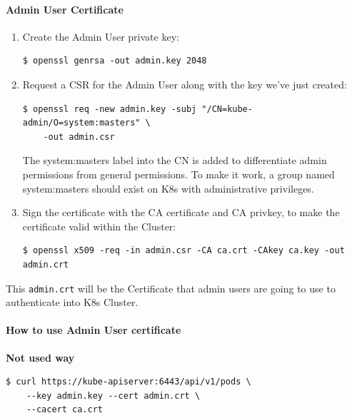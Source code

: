\documentclass{article}
\newenvironment{blocktemplateI}[1]{%
    \tcolorbox[beamer,%
    noparskip,breakable,
    colframe=Violet,%
    colbacklower=Black,%
    title=#1]}%
    {\endtcolorbox}
\newenvironment{codetemplate}[1][]{%
  \mybasecolorbox[#1]
  \itshape
}{%
  \endmybasecolorbox
}
\begin{document}
\paragraph{Admin User Certificate}

\begin{enumerate}
    \item Create the Admin User private key:
\begin{codetemplate}{}
\begin{verbatim}
$ openssl genrsa -out admin.key 2048
\end{verbatim}
\end{codetemplate}

    \item Request a CSR for the Admin User along with the key we've just created:
\begin{codetemplate}{}
\begin{verbatim}
$ openssl req -new admin.key -subj "/CN=kube-admin/O=system:masters" \
    -out admin.csr
\end{verbatim}
\end{codetemplate}
\begin{blocktemplateI}{Note}
The system:masters label into the CN is added to differentiate admin permissions from general permissions. To make it work, a group named system:masters should exist on K8s with administrative privileges.
\end{blocktemplateI}

    \item Sign the certificate with the CA certificate and CA privkey, to make the certificate valid within the Cluster:
\begin{codetemplate}{}
\begin{verbatim}
$ openssl x509 -req -in admin.csr -CA ca.crt -CAkey ca.key -out admin.crt
\end{verbatim}
\end{codetemplate}
\end{enumerate}

This \verb|admin.crt| will be the Certificate that admin users are going to use to authenticate into K8s Cluster.

\paragraph{How to use Admin User certificate}

\textbf{Not used way}
\begin{codetemplate}{}
\begin{verbatim}
$ curl https://kube-apiserver:6443/api/v1/pods \
    --key admin.key --cert admin.crt \
    --cacert ca.crt
\end{verbatim}
\end{codetemplate}
\end{document}
